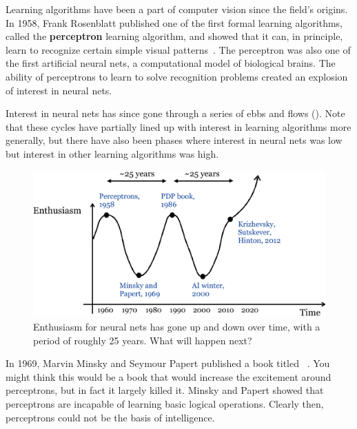 Learning algorithms have been a part of computer vision since the field's origins. In 1958, Frank Rosenblatt published one of the first formal learning algorithms, called the {\bf perceptron}
learning algorithm, and showed that it can, in principle, learn to recognize certain simple visual patterns~\cite{rosenblatt1958perceptron}.
The perceptron was also one of the first artificial neural nets, a computational model of biological brains. The ability of perceptrons to learn to solve recognition problems created an explosion of interest in neural nets.


Interest in neural nets has since gone through a series of ebbs and flows (\fig{\ref{fig:taxonomy:neural_net_enthusiam}}). Note that these cycles have partially lined up with interest in learning algorithms more generally, but there have also been phases where interest in neural nets was low but interest in other learning algorithms was high.

\begin{figure}[t]
    \centerline{
        \includegraphics[width=0.7\linewidth]{figures/taxonomy/neural_net_enthusiasm.eps}
    }
    \caption{Enthusiasm for neural nets has gone up and down over time, with a period of roughly 25 years. What will happen next?}
    \label{fig:taxonomy:neural_net_enthusiam}
\end{figure}


In 1969, Marvin Minsky and Seymour Papert published a book titled ~\cite{marvin1969perceptrons}. You might think this would be a book that would increase the excitement around perceptrons, but in fact it largely killed it. Minsky and Papert showed that perceptrons are incapable of learning basic logical operations. Clearly then, perceptrons could not be the basis of intelligence.

